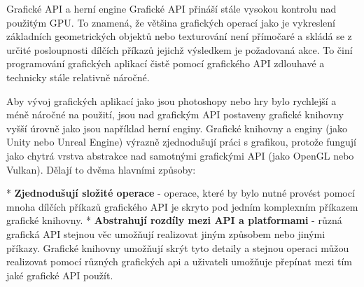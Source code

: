 \sec Grafické API a herní engine
Grafické API přináší stále vysokou kontrolu nad použitým GPU. To znamená, že většina grafických operací jako je vykreslení základních geometrických objektů nebo texturování není přímočaré a skládá se z určité posloupnosti dílčích příkazů jejichž výsledkem je požadovaná akce. To činí programování grafických aplikací čistě pomocí grafického API zdlouhavé a technicky stále relativně náročné. 

Aby vývoj grafických aplikací jako jsou photoshopy nebo hry bylo rychlejší a méně náročné na použití, jsou nad grafickým API postaveny grafické knihovny vyšší úrovně jako jsou například herní enginy. Grafické knihovny a enginy (jako Unity nebo Unreal Engine) výrazně zjednodušují práci s grafikou, protože fungují jako chytrá vrstva abstrakce nad samotnými grafickými API (jako OpenGL nebo Vulkan). Dělají to dvěma hlavními způsoby:

\begitems
* {\bf Zjednodušují složité operace} - operace, které by bylo nutné provést pomocí mnoha dílčích příkazů grafického API je skryto pod jedním komplexním příkazem grafické knihovny. 
* {\bf Abstrahují rozdíly mezi API a platformami} - různá grafická API stejnou věc umožňují realizovat jiným způsobem nebo jinými příkazy. Grafické knihovny umožňují skrýt tyto detaily a stejnou operaci můžou realizovat pomocí různých grafických api a uživateli umožňuje přepínat mezi tím jaké grafické API použít. 
\enditems
